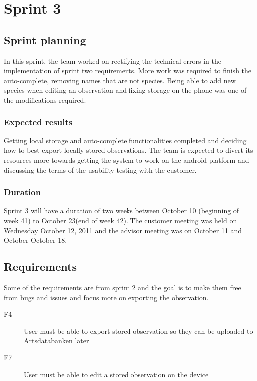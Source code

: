\section{Sprint 3}

\subsection{Sprint planning}

In this sprint, the team worked on rectifying the technical errors in the
implementation of sprint two requirements. More work was required to finish the
auto-complete, removing names that are not species. Being able to add new
species when editing an observation and fixing storage on the phone was one of
the modifications required.

\subsubsection{Expected results}

Getting local storage and auto-complete functionalities completed and
deciding how to best export locally stored observations. The team is
expected to divert its resources more towards getting the system to work on the android
platform and discussing the terms of the usability testing with the customer.

\subsubsection{Duration}

Sprint 3 will have a duration of two weeks between October 10 (beginning of
week 41) to October 23(end of week 42). The customer meeting was held on
Wednesday October 12, 2011 and the advisor meeting was on October 11 and
October October 18.

\subsection{Requirements}

Some of the requirements are from sprint 2 and the goal is to make them free
from bugs and issues and focus more on exporting the observation.

\begin{description}
	\item[F4] User must be able to export stored observation so they can be uploaded to Artsdatabanken later
	\item[F7] User must be able to edit a stored observation on the device
\end{description}

